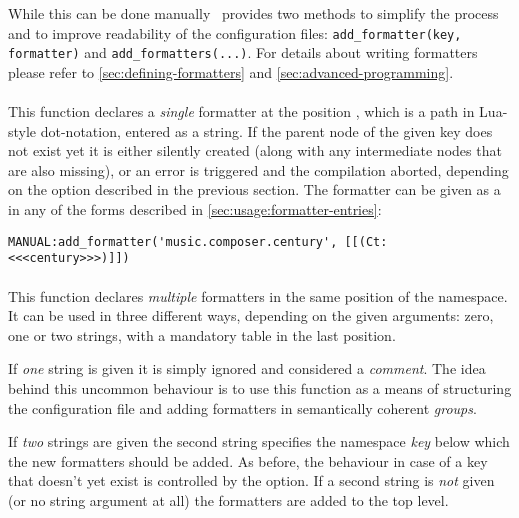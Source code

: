 \documentclass[12pt]{scrartcl}
\begin{document}
\noindent While this can be done manually \luaformatters\ provides two methods to
simplify the process and to improve readability of the configuration files:
\texttt{add_formatter(key, formatter)} and
\texttt{add_formatters(...)}.  For details about writing formatters
please refer to \vref{sec:defining-formatters} and
\vref{sec:advanced-programming}.


\paragraph{}

This function declares a \emph{single} formatter at the position ,
which is a path in Lua-style dot-notation, entered as a string.  If the parent
node of the given key does not exist yet it is either silently created (along
with any intermediate nodes that are also missing), or an error is triggered and
the compilation aborted, depending on the  option described in
the previous section. The formatter can be given as a  in
any of the forms described in \vref{sec:usage:formatter-entries}:

\begin{verbatim}
MANUAL:add_formatter('music.composer.century', [[(Ct: <<<century>>>)]])
\end{verbatim}

\paragraph{}

This function declares \emph{multiple} formatters in the same position of the namespace.  It can be used in three different ways, depending on the given arguments: zero, one or two strings, with a mandatory table in the last position.

If \emph{one} string is given it is simply ignored and considered a
\emph{comment}. The idea behind this uncommon behaviour is to use this function
as a means of structuring the configuration file and adding formatters in
semantically coherent \emph{groups}.

If \emph{two} strings are given the second string specifies the namespace \emph{key} below which the new formatters should be added.  As before, the behaviour in case of a key that doesn't yet exist is controlled by the  option.  If a second string is \emph{not} given (or no string argument at all) the formatters are added to the top level.
\end{document}
